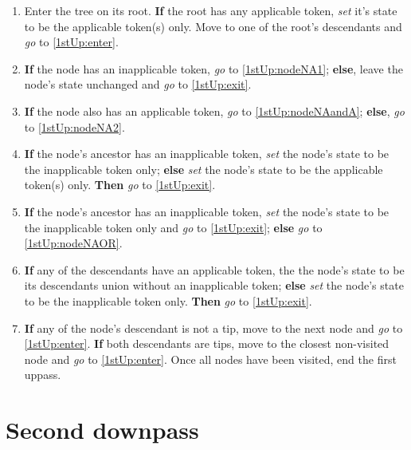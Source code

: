 \documentclass[a4paper,12pt]{article}
\begin{document}
\begin{enumerate}
    \item Enter the tree on its root. \textbf{If} the root has any applicable token, \textit{set} it's state to be the applicable token(s) only. Move to one of the root's descendants and \textit{go} to \ref{1stUp:enter}.
    \item \label{1stUp:enter} \textbf{If} the node has an inapplicable token, \textit{go} to \ref{1stUp:nodeNA1}; \textbf{else}, leave the node's state unchanged and \textit{go} to \ref{1stUp:exit}.
    \item \label{1stUp:nodeNA1} \textbf{If} the node also has an applicable token, \textit{go} to \ref{1stUp:nodeNAandA}; \textbf{else}, \textit{go} to \ref{1stUp:nodeNA2}.
    \item \label{1stUp:nodeNAandA} \textbf{If} the node's ancestor has an inapplicable token, \textit{set} the node's state to be the inapplicable token only; \textbf{else} \textit{set} the node's state to be the applicable token(s) only. \textbf{Then} \textit{go} to \ref{1stUp:exit}.
    \item \label{1stUp:nodeNA2} \textbf{If} the node's ancestor has an inapplicable token, \textit{set} the node's state to be the inapplicable token only and \textit{go} to \ref{1stUp:exit}; \textbf{else} \textit{go} to \ref{1stUp:nodeNAOR}.
    \item \label{1stUp:nodeNAOR} \textbf{If} any of the descendants have an applicable token, the the node's state to be its descendants union without an inapplicable token; \textbf{else} \textit{set} the node's state to be the inapplicable token only. \textbf{Then} \textit{go} to \ref{1stUp:exit}.
    \item \label{1stUp:exit} \textbf{If} any of the node's descendant is not a tip, move to the next node and \textit{go} to \ref{1stUp:enter}. \textbf{If} both descendants are tips, move to the closest non-visited node and \textit{go} to \ref{1stUp:enter}. Once all nodes have been visited, end the first uppass.
\end{enumerate}


\section{Second downpass} \label{2ndDp}
\end{document}
